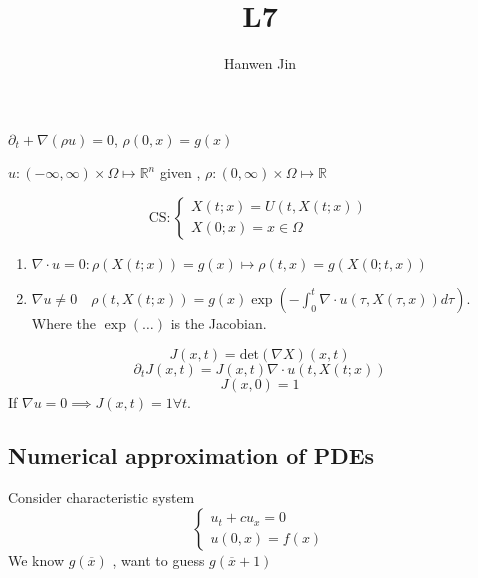 \documentclass[a4paper]{article}
\title{L7}
\author{Hanwen Jin}
\theoremstyle{definition}
\begin{document}
	\maketitle
	$\partial _t+\nabla \left( \rho u \right) =0$, $\rho\left( 0,x \right) =g\left( x \right) $

	$u:\left( -\infty,\infty \right) \times \Omega\mapsto \mathbb{R}^{n}$ given , $\rho:\left( 0,\infty \right) \times \Omega\mapsto \mathbb{R}$

	\begin{equation}
		\text{CS}: \begin{cases}
			X\left( t;x \right) =U\left( t,X\left( t;x\right)  \right) \\
			X\left( 0;x \right) =x\in \Omega
		\end{cases}
	\end{equation} 
	\begin{enumerate}
		\item  $\nabla \cdot u=0:\rho\left( X\left( t;x \right)  \right) =g\left( x \right) \mapsto \rho\left( t,x \right) =g\left( X\left( 0;t,x \right)  \right) $ 
		\item $\nabla u\neq 0 \quad \rho\left( t,X\left( t;x \right)  \right) =g\left( x \right) \exp\left( -\int_{0}^{t} \nabla \cdot u\left( \tau,X\left( \tau,x \right)  \right) d\tau  \right) $. Where the $\exp\left( \ldots \right) $ is the Jacobian. 
	\end{enumerate}
\begin{equation}
	J\left( x,t \right) =\text{det}\left( \nabla X \right) \left( x,t \right) 
\end{equation} 
\begin{equation}
	\partial_t J\left( x,t \right) =J\left( x,t \right) \nabla \cdot u\left( t,X\left( t;x \right)  \right) 
\end{equation} 
\begin{equation}
	J\left( x,0 \right) =1
\end{equation} 
If $\nabla u=0 \implies J\left( x,t \right) =1 \forall t$. 

\subsection{Numerical approximation of PDEs}%
\label{sub:Numerical}
Consider characteristic system
\begin{equation}
	\begin{cases}
		u_t+cu_x=0\\
		u\left( 0,x \right) =f\left( x \right) 
	\end{cases}
\end{equation} 
We know $g\left( \overline{x} \right) $ , want to guess $g\left( \overline{x}+1 \right) $
\end{document}
